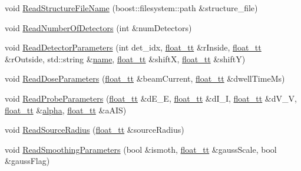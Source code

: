 \begin{DoxyCompactItemize}
\item 
void \hyperlink{class_q_s_t_e_m_1_1_c_qsc_reader_a3c10c95facdb29868c18b2cbd4fd74d5}{Read\-Structure\-File\-Name} (boost\-::filesystem\-::path \&structure\-\_\-file)
\item 
void \hyperlink{class_q_s_t_e_m_1_1_c_qsc_reader_a2f15b6f5f0b40a3e68d4bf10e0ebbc22}{Read\-Number\-Of\-Detectors} (int \&num\-Detectors)
\item 
void \hyperlink{class_q_s_t_e_m_1_1_c_qsc_reader_ab66425a8d6d08c5c1fca652112a9d930}{Read\-Detector\-Parameters} (int det\-\_\-idx, \hyperlink{namespace_q_s_t_e_m_a915d7caa497280d9f927c4ce8d330e47}{float\-\_\-tt} \&r\-Inside, \hyperlink{namespace_q_s_t_e_m_a915d7caa497280d9f927c4ce8d330e47}{float\-\_\-tt} \&r\-Outside, std\-::string \&\hyperlink{qmb_8m_abdc1dcc6fed70c14f9b5ae237e486f4e}{name}, \hyperlink{namespace_q_s_t_e_m_a915d7caa497280d9f927c4ce8d330e47}{float\-\_\-tt} \&shift\-X, \hyperlink{namespace_q_s_t_e_m_a915d7caa497280d9f927c4ce8d330e47}{float\-\_\-tt} \&shift\-Y)
\item 
void \hyperlink{class_q_s_t_e_m_1_1_c_qsc_reader_a1b110ca82c74cc5fbda5cc0bd69c7631}{Read\-Dose\-Parameters} (\hyperlink{namespace_q_s_t_e_m_a915d7caa497280d9f927c4ce8d330e47}{float\-\_\-tt} \&beam\-Current, \hyperlink{namespace_q_s_t_e_m_a915d7caa497280d9f927c4ce8d330e47}{float\-\_\-tt} \&dwell\-Time\-Ms)
\item 
void \hyperlink{class_q_s_t_e_m_1_1_c_qsc_reader_a38fe35a44afac71b8eb1e0457d369eae}{Read\-Probe\-Parameters} (\hyperlink{namespace_q_s_t_e_m_a915d7caa497280d9f927c4ce8d330e47}{float\-\_\-tt} \&d\-E\-\_\-\-E, \hyperlink{namespace_q_s_t_e_m_a915d7caa497280d9f927c4ce8d330e47}{float\-\_\-tt} \&d\-I\-\_\-\-I, \hyperlink{namespace_q_s_t_e_m_a915d7caa497280d9f927c4ce8d330e47}{float\-\_\-tt} \&d\-V\-\_\-\-V, \hyperlink{namespace_q_s_t_e_m_a915d7caa497280d9f927c4ce8d330e47}{float\-\_\-tt} \&\hyperlink{virtual_goniometer_8m_a62197192f0fbf4e0675eb37be1c4c175}{alpha}, \hyperlink{namespace_q_s_t_e_m_a915d7caa497280d9f927c4ce8d330e47}{float\-\_\-tt} \&a\-A\-I\-S)
\item 
void \hyperlink{class_q_s_t_e_m_1_1_c_qsc_reader_ae9adc105be0a0d6a27e10fc8e68512e9}{Read\-Source\-Radius} (\hyperlink{namespace_q_s_t_e_m_a915d7caa497280d9f927c4ce8d330e47}{float\-\_\-tt} \&source\-Radius)
\item 
void \hyperlink{class_q_s_t_e_m_1_1_c_qsc_reader_a7ba3963c769e2c790b96bb50d7b02478}{Read\-Smoothing\-Parameters} (bool \&ismoth, \hyperlink{namespace_q_s_t_e_m_a915d7caa497280d9f927c4ce8d330e47}{float\-\_\-tt} \&gauss\-Scale, bool \&gauss\-Flag)

\end{DoxyCompactItemize}
